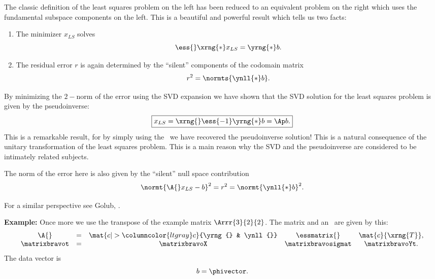 \documentclass[10pt]{newsiambook}
\begin{document}
The classic definition of the least squares problem on the left has been reduced to an equivalent problem on the right which uses the fundamental subspace components on the left. This is a beautiful and powerful result which tells us two facts:
\begin{enumerate}
\item The minimizer $x_{LS}$ solves
\begin{equation}
  \ess{}\xrng{*}x_{LS} = \yrng{*}b.
\end{equation}
\item The residual error $r$ is again determined by the ``silent'' components of the codomain matrix
\begin{equation}
  r^{2} = \normts{\ynll{*}b} .
\end{equation}
\end{enumerate}

By minimizing the $2-$norm of the error using the SVD expansion we have shown that the SVD solution for the least squares problem is given by the pseudoinverse:
\begin{equation}
\boxed{
  x_{LS} = \xrng{}\ess{-1}\yrng{*}b = \Ap b.
  }
  \label{eq:13:bingo}
\end{equation}
This is a remarkable result, for by simply using the \svdl \ we have recovered the pseudoinverse solution! This is a natural consequence of the unitary transformation of the least squares problem. This is a main reason why the SVD and the pseudoinverse are considered to be intimately related subjects.

The norm of the error here is also given by the ``silent'' null space contribution
\begin{equation}
  \normt{\A{}x_{LS} - b}^{2} =  r^{2} = \normt{\ynll{*}b}^{2}.
\end{equation}

For a similar perspective see Golub, \cite[p. 257]{Golub}.

\textbf{Example:} Once more we use the transpose of the example matrix $\Arrr{3}{2}{2}$. The matrix and an \svdl \  are given by this:
\begin{equation}
  \begin{array}{ccccc}
    \A{} & = & \mat{c|>{\columncolor{ltgray}}c}{\yrng{} & \ynll{}}
             & \essmatrix{}
             & \mat{c}{\xrng{T}}, \\
    \matrixbravot & = &
    \matrixbravoX & \matrixbravosigmat & \matrixbravoYt.
  \end{array}
\end{equation}
The data vector is
\begin{equation}
  b = \phivector.
\end{equation}
\end{document}
